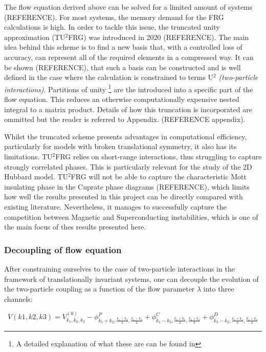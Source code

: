 \documentclass[12pt]{article}
\begin{document}
The flow equation derived above can be solved for a limited amount of systems (REFERENCE). For most systems, the memory demand for the 
FRG calculations is high.  In order to tackle this issue, the truncated unity approximation (TU$^2$FRG) was introduced in 2020 (REFERENCE). 
The main idea behind this scheme is to find a new basis that, with a controlled loss of accuracy, can represent all 
of the required elements in a compressed way. It can be shown (REFERENCE), that such a basis can be constructed and is 
well defined in the case where the calculation is constrained to terms U$^{2}$ \textit{(two-particle interactions)}.
Partitions of unity \footnote{A detailed explanation of what these are can be found in} are the introduced into a specific part of the flow equation. This reduces an otherwise computationally expensive nested integral to a matrix product. 
Details of how this truncation is incorporated are ommitted but the reader is referred to Appendix. (REFERENCE appendix).\par
\medskip

\noindent Whilst the truncated scheme presents advantages in computational efficiency, particularly for models with broken translational symmetry, it also has its limitations. 
TU$^2$FRG relies on short-range interactions, thus struggling to capture strongly correlated phases. 
This is particularly relevant for the study of the 2D Hubbard model. TU$^2$FRG will not be able to capture
the characteristic Mott insulating phase in the Cuprate phase diagrams (REFERENCE), which limits how well the results presented in this project can be directly compared with existing literature. 
Nevertheless, it manages to successfully capture the competition between Magnetic and Superconducting instabilities, which is one of the main focus of thes results presented here. 
\subsubsection{Decoupling of flow equation}
After constraining ourselves to the case of two-particle interactions in the framework of translationally invariant systems, one can decouple  the evolution of the two-particle coupling as a function of the flow parameter $\lambda$ into three channels:

\begin{equation} \label{V decoupling}
    V(k1,k2,k3)= V_{k_1, k_2, k_3}^{(0)} - \phi^{P}_{k_1 +k_2, \frac{k_1 - k_2}{2}, \frac{k_4-k_3}{2}} + \phi^{C}_{k_1 - k_3, \frac{k_1 +k_3}{2}, \frac{k_2+k_4}{2}} +\phi^{D}_{k_3- k_2, \frac{k_1 + k_4}{2}, \frac{k_2+k_3}{2}}
\end{equation}
\end{document}
